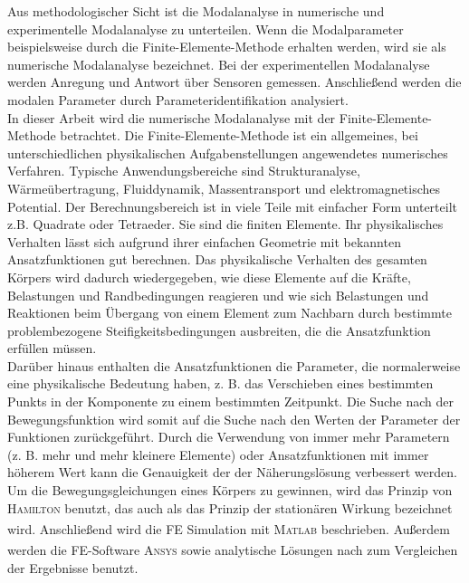 \documentclass[a4paper,10pt,twoside]{article}
\numberwithin{equation}{section} %
\numberwithin{figure}{section}   %
\numberwithin{table}{section}    %
\newcommand{\Matlab}{\textsc{Matlab}\textsuperscript{\textregistered} }
\newcommand{\Ansys}{\textsc{Ansys}\textsuperscript{\textregistered} }
\begin{document}
	Aus methodologischer Sicht ist die Modalanalyse in numerische und experimentelle Modalanalyse zu unterteilen. Wenn die Modalparameter beispielsweise durch die Finite-Elemente-Methode erhalten werden, wird sie als numerische Modalanalyse bezeichnet. Bei der experimentellen Modalanalyse werden Anregung und Antwort über Sensoren gemessen. Anschließend werden die modalen Parameter durch Parameteridentifikation analysiert.\\
	
	In dieser Arbeit wird die numerische Modalanalyse mit der Finite-Elemente-Methode betrachtet. Die Finite-Elemente-Methode ist ein allgemeines, bei unterschiedlichen physikalischen Aufgabenstellungen angewendetes numerisches Verfahren. Typische Anwendungsbereiche sind Strukturanalyse, Wärmeübertragung, Fluiddynamik, Massentransport und elektromagnetisches Potential. Der Berechnungsbereich ist in viele Teile mit einfacher Form unterteilt z.B. Quadrate oder Tetraeder. Sie sind die \glqq finiten Elemente\grqq. Ihr physikalisches Verhalten lässt sich aufgrund ihrer einfachen Geometrie mit bekannten Ansatzfunktionen gut berechnen. Das physikalische Verhalten des gesamten Körpers wird dadurch wiedergegeben, wie diese Elemente auf die Kräfte, Belastungen und Randbedingungen reagieren und wie sich Belastungen und Reaktionen beim Übergang von einem Element zum Nachbarn durch bestimmte problembezogene Steifigkeitsbedingungen ausbreiten, die die Ansatzfunktion erfüllen müssen.\\
	
	Darüber hinaus enthalten die Ansatzfunktionen die Parameter, die normalerweise eine physikalische Bedeutung haben, z. B. das Verschieben eines bestimmten Punkts in der Komponente zu einem bestimmten Zeitpunkt. Die Suche nach der Bewegungsfunktion wird somit auf die Suche nach den Werten der Parameter der Funktionen zurückgeführt. Durch die Verwendung von immer mehr Parametern (z. B. mehr und mehr kleinere Elemente) oder Ansatzfunktionen mit immer höherem Wert kann die Genauigkeit der der Näherungslösung verbessert werden.\\
	
	Um die Bewegungsgleichungen eines Körpers zu gewinnen, wird das Prinzip von \textsc{Hamilton} benutzt, das auch als das Prinzip der stationären Wirkung bezeichnet wird. Anschließend wird die FE Simulation mit \Matlab beschrieben. Außerdem werden die FE-Software \Ansys sowie analytische Lösungen nach \cite{stephan1995schwingungen} zum Vergleichen der Ergebnisse benutzt.
	
\end{document}
